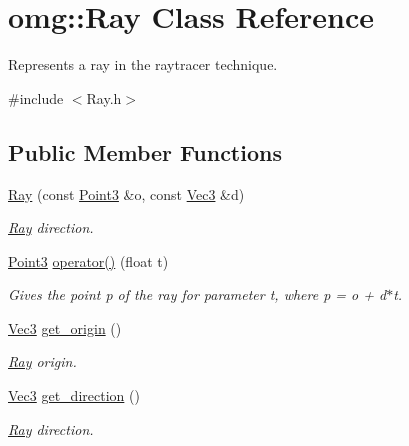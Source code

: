 \hypertarget{classomg_1_1_ray}{}\section{omg\+::Ray Class Reference}
\label{classomg_1_1_ray}


Represents a ray in the raytracer technique.  




{\ttfamily \#include $<$Ray.\+h$>$}

\subsection*{Public Member Functions}
\begin{DoxyCompactItemize}
\item 
\mbox{\hyperlink{classomg_1_1_ray_a7418b3be2225de5510c63781ee5ad3f1}{Ray}} (const \mbox{\hyperlink{namespaceomg_af3df7d66f0c70fe64649fcbe00edba5e}{Point3}} \&o, const \mbox{\hyperlink{namespaceomg_acf927839a305877d454c507f0b96730b}{Vec3}} \&d)
\begin{DoxyCompactList}\small\item\em \mbox{\hyperlink{classomg_1_1_ray}{Ray}} direction. \end{DoxyCompactList}\item 
\mbox{\hyperlink{namespaceomg_af3df7d66f0c70fe64649fcbe00edba5e}{Point3}} \mbox{\hyperlink{classomg_1_1_ray_aa330c945bb3265ff966071591173ec13}{operator()}} (float t)
\begin{DoxyCompactList}\small\item\em Gives the point p of the ray for parameter t, where p = o + d$\ast$t. \end{DoxyCompactList}\item 
\mbox{\hyperlink{namespaceomg_acf927839a305877d454c507f0b96730b}{Vec3}} \mbox{\hyperlink{classomg_1_1_ray_a7f7c541289c92949e737522248be9b98}{get\+\_\+origin}} ()
\begin{DoxyCompactList}\small\item\em \mbox{\hyperlink{classomg_1_1_ray}{Ray}} origin. \end{DoxyCompactList}\item 
\mbox{\hyperlink{namespaceomg_acf927839a305877d454c507f0b96730b}{Vec3}} \mbox{\hyperlink{classomg_1_1_ray_af78835511d6eb2d50fafdacb69e82b8c}{get\+\_\+direction}} ()
\begin{DoxyCompactList}\small\item\em \mbox{\hyperlink{classomg_1_1_ray}{Ray}} direction. \end{DoxyCompactList}\end{DoxyCompactItemize}


